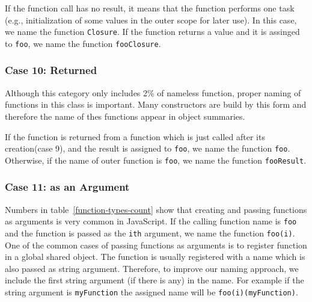\documentclass[10pt, preprint]{sigplanconf}
\begin{document}
{If the function call has no result, it means that the function performs one task (e.g., initialization of some values in the outer scope for later use). In this case, we name the function {\small\texttt{Closure}}. If the function returns a value and it is assinged to {\small\texttt{foo}}, we name the function {\small\texttt{fooClosure}}.

\subsubsection{Case 10: Returned}
Although this category only includes 2\% of nameless function, proper naming of functions in this class is important. Many constructors are build by this form and therefore the name of thes functions appear in object summaries.

If the function is returned from a function which is just called after its creation(case 9), and the result is assigned to {\small\texttt{foo}}, we name the function {\small\texttt{foo}}. Otherwise, if the name of outer function is {\small\texttt{foo}}, we name the function {\small\texttt{fooResult}}.


\subsubsection{Case 11: as an Argument}
Numbers in table~\ref{function-types-count} show that creating and passing functions as arguments is very common in JavaScript. If the calling function name is 
{\small\texttt{foo}} and the function is passed as the {\small\texttt{ith}} argument, we name the function {\small\texttt{foo(i)}}. One of the common cases of passing
functions as arguments is to register function in a global shared object. The function is usually registered with a name which is also passed as string argument. Therefore, to improve our naming approach, we include the first string argument (if there is any) in the name. For example if the string argument is {\small\texttt{myFunction}} the assigned name will be {\small\texttt{foo(i)(myFunction)}}.


}
\end{document}
